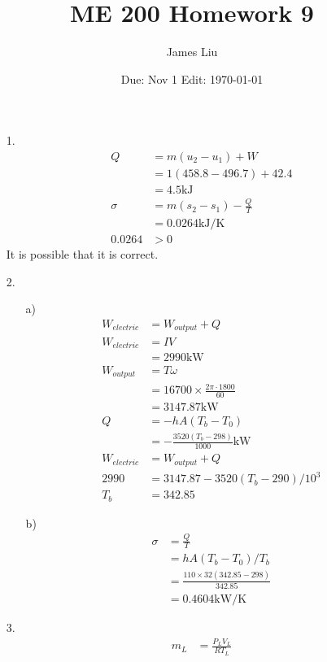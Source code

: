 \documentclass{article}
\date{Due: Nov 1 Edit: \today}
\title{ME 200 Homework 9}
\author{James Liu}
\begin{document}
\maketitle
\begin{itemize}
    \item [1.] 
    \begin{align*}
        Q&=m(u_2-u_1)+W\\
        &=1(458.8-496.7)+42.4\\
        &=4.5 \text{kJ}\\
        \sigma &= m(s_2-s_1)-\frac{Q}{T}\\
        &=0.0264 \text{kJ/K}\\
        0.0264&>0
    \end{align*}
    It is possible that it is correct.
    \item [2.]
    \begin{itemize}
        \item [a)] \begin{align*}
            W_{electric}&=W_{output}+Q\\
            W_{electric}&=IV\\
            &=2990 \text{kW}\\
            W_{output}&=T\omega\\
            &=16700\times \frac{2\pi \cdot 1800}{60}\\
            &=3147.87 \text{kW}\\
            Q&=-hA(T_b-T_0)\\
            &=-\frac{3520(T_b-298)}{1000} \text{kW}\\
            W_{electric}&=W_{output}+Q\\
            2990&=3147.87-3520(T_b-290)/10^3\\
            T_b &= 342.85
        \end{align*}
        \item [b)] \begin{align*}
        \sigma &= \frac{Q}{T}\\
                &=hA(T_b-T_0)/T_b\\
                &=\frac{110\times 32(342.85-298)}{342.85}\\
                &=0.4604 \text{kW/K}
        \end{align*}
    \end{itemize}
    \item [3.]
    \begin{align*}
        m_L &=\frac{P_LV_L}{RT_L}\\

\end{align*}
\end{itemize}
\end{document}
